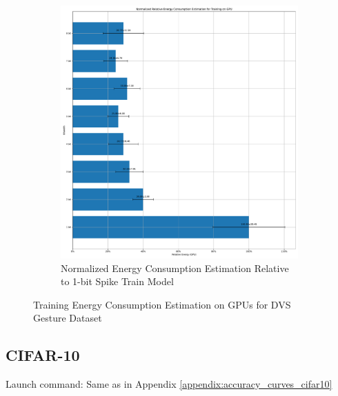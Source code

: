 \begin{figure}[H]
\begin{subfigure}[H]{0.48\textwidth}
                \includegraphics[width=\textwidth]{../standard/DVSGesture/plots/dvsgesture_train_relative_energy_gpu.pdf}
                \caption{Normalized Energy Consumption Estimation Relative to 1-bit Spike Train Model}
            \end{subfigure}
            \caption{Training Energy Consumption Estimation on GPUs for DVS Gesture Dataset}
        \end{figure}

    \subsection{CIFAR-10}
    \label{appendix:energy_gpu_cifar10}
        Launch command: Same as in Appendix \ref{appendix:accuracy_curves_cifar10}

